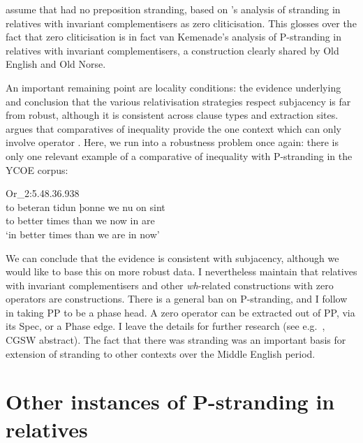 \documentclass[output=paper]{langsci/langscibook}
\begin{document}
\citet{EmoFaa2014} assume that  had no preposition stranding, based
on ’s analysis of stranding in relatives with
invariant complementisers as zero cliticisation. This glosses over the fact
that zero cliticisation is in fact van Kemenade’s analysis of P-stranding in
relatives with invariant complementisers, a construction clearly shared by Old
English and Old Norse.

An important remaining point are locality conditions: the evidence underlying
 and  conclusion that the various
relativisation strategies respect subjacency is far from robust, although it is
consistent across clause types and extraction sites. \citet[181--186]{Abels2003}
argues that comparatives of inequality provide the one context which can only
involve operator . Here, we run into a robustness problem once again:
there is only one relevant example of a comparative of inequality with
P-stranding in the YCOE corpus:

\ea Or\_2:5.48.36.938%
    \label{ex:11.9}\\
     \gll to beteran tidun  þonne we nu    on sint \\
        to better    times than    we now in  are \\
    \glt ‘in better times than we are in now’
\z

We can conclude that the evidence is consistent with subjacency, although we
would like to base this on more robust data. I nevertheless maintain that
relatives with invariant complementisers and other \textit{wh}-related
constructions with zero operators are  constructions. There is a
general ban on P-stranding, and I follow \textcite{Abels2003,Abels2012} in
taking PP to be a phase head. A zero operator can be extracted out of PP, via
its Spec, or a Phase edge. I leave the details for further research (see e.g.\
\citealt{Walkden2017}, CGSW abstract). The fact that there was stranding was an
important basis for extension of stranding to other contexts over the Middle
English period.

\section{Other instances of P-stranding in relatives}
\end{document}
